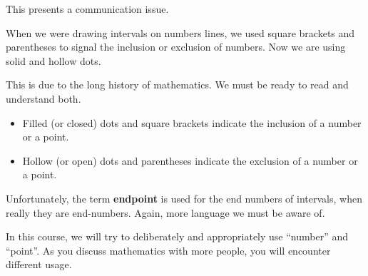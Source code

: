 \documentclass{ximera}
\begin{document}
This presents a communication issue.  


When we were drawing intervals on numbers lines, we used square brackets and parentheses to signal the inclusion or exclusion of numbers.  Now we are using solid and hollow dots. 

This is due to the long history of mathematics.  We must be ready to read and understand both.


\begin{itemize}
\item Filled (or closed) dots and square brackets indicate the inclusion of a number or a point.
\item Hollow (or open) dots and parentheses indicate the exclusion of a number or a point.
\end{itemize}

Unfortunately, the term \textbf{endpoint} is used for the end numbers of intervals, when really they are end-numbers. Again, more language we must be aware of.

In this course, we will try to deliberately and appropriately use ``number'' and ``point''.  As you discuss mathematics with more people, you will encounter different usage.
\end{document}
